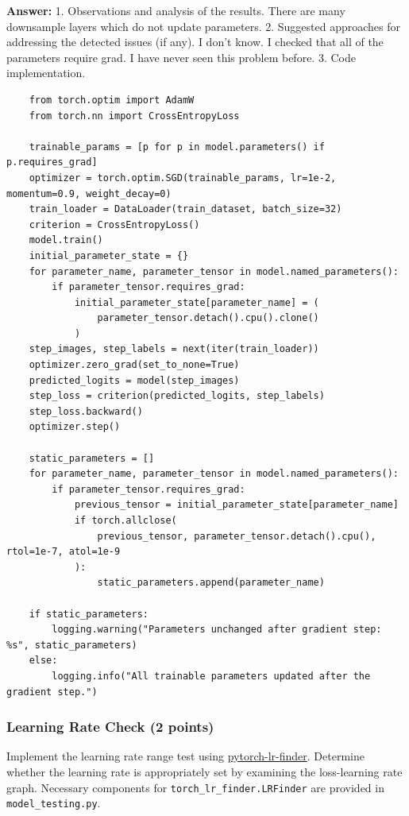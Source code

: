 \documentclass[11pt, oneside]{article}   	%
\begin{document}
\begin{answerbox} \textbf{Answer:} \vspace*{1cm}
1. Observations and analysis of the results.
    There are many downsample layers which do not update parameters.
2. Suggested approaches for addressing the detected issues (if any).
    I don't know. I checked that all of the parameters require grad. I have never seen this problem before.
3. Code implementation.
\begin{verbatim}
    from torch.optim import AdamW
    from torch.nn import CrossEntropyLoss
    
    trainable_params = [p for p in model.parameters() if p.requires_grad]
    optimizer = torch.optim.SGD(trainable_params, lr=1e-2, momentum=0.9, weight_decay=0)
    train_loader = DataLoader(train_dataset, batch_size=32)
    criterion = CrossEntropyLoss()
    model.train()
    initial_parameter_state = {}
    for parameter_name, parameter_tensor in model.named_parameters():
        if parameter_tensor.requires_grad:
            initial_parameter_state[parameter_name] = (
                parameter_tensor.detach().cpu().clone()
            )
    step_images, step_labels = next(iter(train_loader))
    optimizer.zero_grad(set_to_none=True)
    predicted_logits = model(step_images)
    step_loss = criterion(predicted_logits, step_labels)
    step_loss.backward()
    optimizer.step()
    
    static_parameters = []
    for parameter_name, parameter_tensor in model.named_parameters():
        if parameter_tensor.requires_grad:
            previous_tensor = initial_parameter_state[parameter_name]
            if torch.allclose(
                previous_tensor, parameter_tensor.detach().cpu(), rtol=1e-7, atol=1e-9
            ):
                static_parameters.append(parameter_name)
    
    if static_parameters:
        logging.warning("Parameters unchanged after gradient step: %s", static_parameters)
    else:
        logging.info("All trainable parameters updated after the gradient step.")
\end{verbatim}
\end{answerbox}


\subsubsection*{Learning Rate Check (2 points)}
 Implement the learning rate range test using \href{https://github.com/davidtvs/pytorch-lr-finder#tweaked-version-from-fastaiauto}{pytorch-lr-finder}. Determine whether the learning rate is appropriately set by examining the loss-learning rate graph. Necessary components for \texttt{torch\_lr\_finder.LRFinder} are provided in \texttt{model\_testing.py}.
\end{document}
